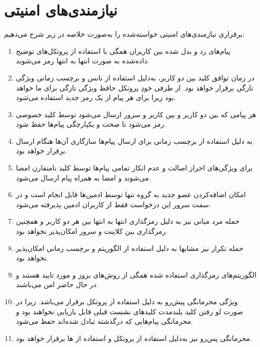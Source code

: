 \documentclass{article}
\begin{document}
\section{نیازمندی‌های امنیتی}
برقراری نیازمندی‌های امنیتی خواسته‌شده را به‌صورت خلاصه در زیر شرح می‌دهیم:
\begin{enumerate}
	\item 
	پیام‌های رد و بدل شده بین کاربران همگی با استفاده از پروتکل‌های توضیح داده‌شده به صورت انتها به انتها رمز می‌شوند.
	\item
	در زمان توافق کلید بین دو کاربر، به‌دلیل استفاده از نانس و برچسب زمانی ویژگی تازگی برقرار خواهد بود.
	از طرفی خودِ پروتکل  حافظ ویژگی تازگی برای ما خواهد بود زیرا برای هر پیام از یک رمز جدید استفاده می‌شود.
	\item
	هر پیامی که بین دو کاربر و بین کاربر و سرور ارسال می‌شود توسط کلید خصوصی رمز می‌شود تا صحت و یکپارچگی پیام‌ها حفظ شود.
	\item
	به دلیل استفاده از برچسب زمانی برای ارسال پیام‌ها سازگاری آن‌‌ها هنگام ارسال برقرار خواهد بود.
	\item 
	برای ویژگی‌های احراز اصالت و عدم انکار تمامی پیام‌ها توسط کلید نامتقارن امضا می‌شوند و امضا به همراه پیام ارسال می‌شود.
	\item
	امکان اضافه‌کردن عضو جدید به گروه تنها توسط ادمین‌ها قابل انجام است و در سمت سرور این درخواست فقط از کاربران ادمین پذیرفته می‌شود.
	\item 
	حمله مرد میانی نیز به دلیل رمزگذاری انتها به انتها بین هر دو کاربر و همچنین رمزگذاری بین کلاینت و سرور امکان‌پذیر نخواهد بود.
	\item 
	حمله تکرار نیز مشابها به دلیل استفاده از الگوریتم  و برچسب زمانی امکان‌پذیر نخواهد بود.
	\item
	الگوریتم‌های رمزگذاری استفاده شده همگی از روش‌های بروز و مورد تایید هستند و در حال حاضر امن می‌باشند.
	\item 
	ویژگی محرمانگی پیش‌رو به دلیل استفاده از پروتکل  برقرار می‌باشد.
	زیرا در صورت لو رفتن کلید بلندمدت کلیدهای نشست قبلی قابل بازیابی نخواهند بود و محرمانگی پیام‌هایی که درگذشته تبادل شده‌اند حفظ می‌شود.
	\item 
	محرمانگی پس‌رو نیز به‌دلیل استفاده از پروتکل  و استفاده از ها برقرار خواهد بود.
	
\end{enumerate}
\end{document}

